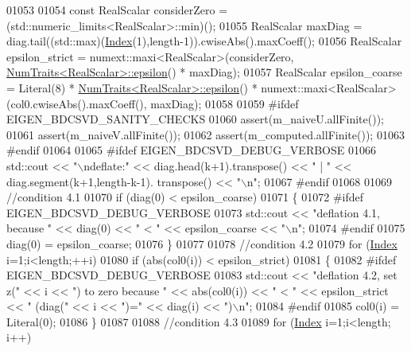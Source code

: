 \begin{DoxyCode}
01053   
01054   \textcolor{keyword}{const} RealScalar considerZero = (std::numeric\_limits<RealScalar>::min)();
01055   RealScalar maxDiag = diag.tail((std::max)(\hyperlink{namespace_eigen_a62e77e0933482dafde8fe197d9a2cfde}{Index}(1),length-1)).cwiseAbs().maxCoeff();
01056   RealScalar epsilon\_strict = numext::maxi<RealScalar>(considerZero,
      \hyperlink{group___core___module_struct_eigen_1_1_num_traits}{NumTraits<RealScalar>::epsilon}() * maxDiag);
01057   RealScalar epsilon\_coarse = Literal(8) * \hyperlink{group___core___module_struct_eigen_1_1_num_traits}{NumTraits<RealScalar>::epsilon}() *
       numext::maxi<RealScalar>(col0.cwiseAbs().maxCoeff(), maxDiag);
01058   
01059 \textcolor{preprocessor}{#ifdef EIGEN\_BDCSVD\_SANITY\_CHECKS}
01060   assert(m\_naiveU.allFinite());
01061   assert(m\_naiveV.allFinite());
01062   assert(m\_computed.allFinite());
01063 \textcolor{preprocessor}{#endif}
01064 
01065 \textcolor{preprocessor}{#ifdef  EIGEN\_BDCSVD\_DEBUG\_VERBOSE  }
01066   std::cout << \textcolor{stringliteral}{"\(\backslash\)ndeflate:"} << diag.head(k+1).transpose() << \textcolor{stringliteral}{"  |  "} << diag.segment(k+1,length-k-1).
      transpose() << \textcolor{stringliteral}{"\(\backslash\)n"};
01067 \textcolor{preprocessor}{#endif}
01068   
01069   \textcolor{comment}{//condition 4.1}
01070   \textcolor{keywordflow}{if} (diag(0) < epsilon\_coarse)
01071   \{ 
01072 \textcolor{preprocessor}{#ifdef  EIGEN\_BDCSVD\_DEBUG\_VERBOSE}
01073     std::cout << \textcolor{stringliteral}{"deflation 4.1, because "} << diag(0) << \textcolor{stringliteral}{" < "} << epsilon\_coarse << \textcolor{stringliteral}{"\(\backslash\)n"};
01074 \textcolor{preprocessor}{#endif}
01075     diag(0) = epsilon\_coarse;
01076   \}
01077 
01078   \textcolor{comment}{//condition 4.2}
01079   \textcolor{keywordflow}{for} (\hyperlink{namespace_eigen_a62e77e0933482dafde8fe197d9a2cfde}{Index} i=1;i<length;++i)
01080     \textcolor{keywordflow}{if} (abs(col0(i)) < epsilon\_strict)
01081     \{
01082 \textcolor{preprocessor}{#ifdef  EIGEN\_BDCSVD\_DEBUG\_VERBOSE}
01083       std::cout << \textcolor{stringliteral}{"deflation 4.2, set z("} << i << \textcolor{stringliteral}{") to zero because "} << abs(col0(i)) << \textcolor{stringliteral}{" < "} << 
      epsilon\_strict << \textcolor{stringliteral}{"  (diag("} << i << \textcolor{stringliteral}{")="} << diag(i) << \textcolor{stringliteral}{")\(\backslash\)n"};
01084 \textcolor{preprocessor}{#endif}
01085       col0(i) = Literal(0);
01086     \}
01087 
01088   \textcolor{comment}{//condition 4.3}
01089   \textcolor{keywordflow}{for} (\hyperlink{namespace_eigen_a62e77e0933482dafde8fe197d9a2cfde}{Index} i=1;i<length; i++)

\end{DoxyCode}
